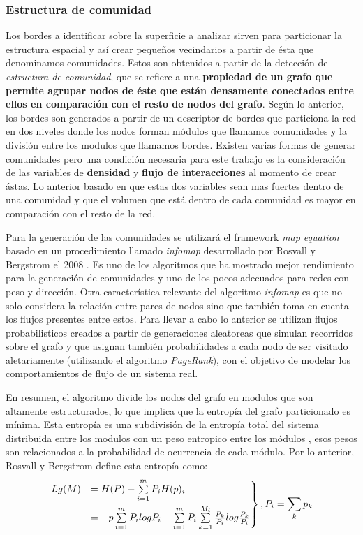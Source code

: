 \documentclass[12pt]{article}
\begin{document}
	\subsubsection{Estructura de comunidad}
	
	Los bordes a identificar sobre la superficie a analizar sirven para particionar la estructura espacial y así crear pequeños vecindarios a partir de ésta que denominamos comunidades. Estos son obtenidos a partir de la detección de \textit{estructura de comunidad}, que se refiere a una \textbf{propiedad de un grafo que permite agrupar nodos de éste que están densamente conectados entre ellos en comparación con el resto de nodos del grafo}. Según lo anterior, los bordes son generados a partir de un descriptor de bordes que particiona la red en dos niveles donde los nodos forman módulos que llamamos comunidades y la división entre los modulos que llamamos bordes. Existen varias formas de generar comunidades pero una condición necesaria para este trabajo es la consideración de las variables  de \textbf{densidad} y \textbf{flujo de interacciones} al momento de crear ástas. Lo anterior basado en que estas dos variables sean mas fuertes dentro de una comunidad y que el volumen que está dentro de cada comunidad es mayor en comparación con el resto de la red.
	
	Para la generación de las comunidades se utilizará el framework \textit{map equation} basado en un procedimiento llamado \textit{infomap} desarrollado por Rosvall y Bergstrom el 2008 \cite{infomap}. Es uno de los algoritmos que ha mostrado mejor rendimiento para la generación de comunidades y uno de los pocos adecuados para redes con peso y dirección. Otra característica relevante del algoritmo \textit{infomap} es que no solo considera la relación entre pares de nodos sino que también toma en cuenta los flujos presentes entre estos. Para llevar a cabo lo anterior se utilizan flujos probabilisticos creados a partir de generaciones aleatoreas que simulan recorridos sobre el grafo y que asignan también probabilidades a cada nodo de ser visitado aletariamente (utilizando el algoritmo \textit{PageRank}), con el objetivo de modelar los comportamientos de flujo de un sistema real.
	
	En resumen, el algoritmo divide los nodos del grafo en modulos que son altamente estructurados, lo que implica que la entropía del grafo particionado es mínima. Esta entropía es una subdivisión de la entropía total del sistema distribuida entre los modulos con un peso entropico entre los módulos , esos pesos son relacionados a la probabilidad de ocurrencia de cada módulo. Por lo anterior, Rosvall y Bergstrom define esta entropía como:
	$$
	\begin{rcases}
	Lg(M) &= H(P) + \sum\limits_{i=1}^m P_i H(p)_i \\
	      &= -p\sum\limits_{i=1}^m P_i log P_i -\sum\limits_{i=1}^m P_i\sum\limits_{k=1}^{M_i} \frac{P_k}{P_i}log\frac{P_k}{P_i}
	\end{rcases} , P_i = \sum_k p_k
	$$
	
\end{document}
